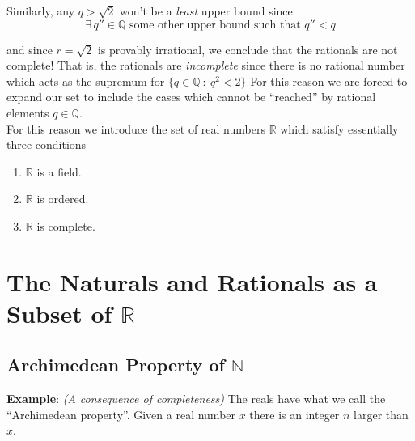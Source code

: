 \documentclass[12pt]{article}
\newlength\tindent
\renewcommand{\indent}{\hspace*{\tindent}}
\newcommand{\R}{\mathbb R}
\newcommand{\N}{\mathbb N}
\newcommand{\Q}{\mathbb Q}
\begin{document}
Similarly, any $q > \sqrt{2}$ won't be a {\em least} upper bound since
\begin{equation*}
	\exists\,q'' \in \Q \text{ some other upper bound such that } q'' < q
\end{equation*}

and since $r = \sqrt{2}$ is provably irrational, we conclude that the rationals are not complete! That is, the rationals are {\em incomplete} since there is no rational number which acts as the supremum for $\{q \in \Q ~:~ q^2 < 2\}$ For this reason we are forced to expand our set to include the cases which cannot be ``reached'' by rational elements $q \in \Q$. \\

\indent For this reason we introduce the set of real numbers $\R$ which satisfy essentially three conditions
\begin{enumerate}[(1)]
	\item $\R$ is a field.
	\item $\R$ is ordered.
	\item $\R$ is complete.
\end{enumerate}


\section{The Naturals and Rationals as a Subset of $\bm{\R}$}
\subsection{Archimedean Property of $\bm{\N}$}

%
%
{\bf Example}: {\em (A consequence of completeness)} The reals have what we call the ``Archimedean property''. Given a real number $x$ there is an integer $n$ larger than $x$.
\end{document}
